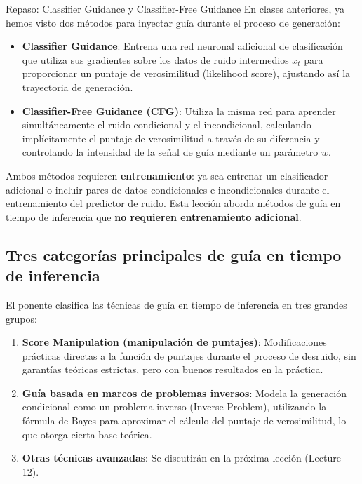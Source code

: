 \begin{knowledgebox}{Repaso: Classifier Guidance y Classifier-Free Guidance}
En clases anteriores, ya hemos visto dos métodos para inyectar guía durante el proceso de generación:
\begin{itemize}
    \item \textbf{Classifier Guidance}: Entrena una red neuronal adicional de clasificación que utiliza sus gradientes sobre los datos de ruido intermedios $x_t$ para proporcionar un puntaje de verosimilitud (likelihood score), ajustando así la trayectoria de generación.
    \item \textbf{Classifier-Free Guidance (CFG)}: Utiliza la misma red para aprender simultáneamente el ruido condicional y el incondicional, calculando implícitamente el puntaje de verosimilitud a través de su diferencia y controlando la intensidad de la señal de guía mediante un parámetro $w$.
\end{itemize}
Ambos métodos requieren \textbf{entrenamiento}: ya sea entrenar un clasificador adicional o incluir pares de datos condicionales e incondicionales durante el entrenamiento del predictor de ruido. Esta lección aborda métodos de guía en tiempo de inferencia que \textbf{no requieren entrenamiento adicional}.
\end{knowledgebox}

\subsection{Tres categorías principales de guía en tiempo de inferencia}

El ponente clasifica las técnicas de guía en tiempo de inferencia en tres grandes grupos:

\begin{enumerate}
    \item \textbf{Score Manipulation (manipulación de puntajes)}: Modificaciones prácticas directas a la función de puntajes durante el proceso de desruido, sin garantías teóricas estrictas, pero con buenos resultados en la práctica.
    \item \textbf{Guía basada en marcos de problemas inversos}: Modela la generación condicional como un problema inverso (Inverse Problem), utilizando la fórmula de Bayes para aproximar el cálculo del puntaje de verosimilitud, lo que otorga cierta base teórica.
    \item \textbf{Otras técnicas avanzadas}: Se discutirán en la próxima lección (Lecture 12).
\end{enumerate}

